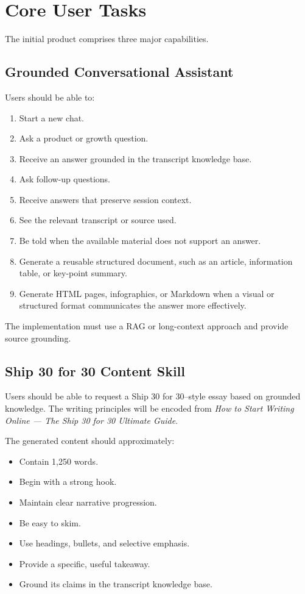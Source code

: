 \documentclass[11pt]{article}
\begin{document}
\section{Core User Tasks}

The initial product comprises three major capabilities.

\subsection{Grounded Conversational Assistant}
Users should be able to:
\begin{enumerate}
  \item Start a new chat.
  \item Ask a product or growth question.
  \item Receive an answer grounded in the transcript knowledge base.
  \item Ask follow-up questions.
  \item Receive answers that preserve session context.
  \item See the relevant transcript or source used.
  \item Be told when the available material does not support an answer.
  \item Generate a reusable structured document, such as an article, information table, or key-point summary.
  \item Generate HTML pages, infographics, or Markdown when a visual or structured format communicates the answer more effectively.
\end{enumerate}

The implementation must use a RAG or long-context approach and provide source grounding.

\subsection{Ship 30 for 30 Content Skill}
Users should be able to request a Ship 30 for 30--style essay based on grounded knowledge. The writing principles will be encoded from \emph{How to Start Writing Online — The Ship 30 for 30 Ultimate Guide}.

The generated content should approximately:
\begin{itemize}
  \item Contain 1,250 words.
  \item Begin with a strong hook.
  \item Maintain clear narrative progression.
  \item Be easy to skim.
  \item Use headings, bullets, and selective emphasis.
  \item Provide a specific, useful takeaway.
  \item Ground its claims in the transcript knowledge base.
\end{itemize}
\end{document}
